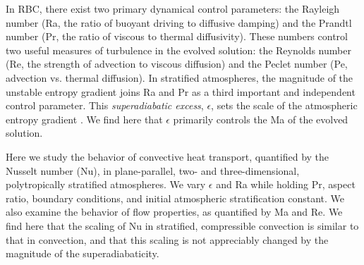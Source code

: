 In RBC, there exist two primary dynamical control parameters: 
the Rayleigh number (Ra, the ratio of
buoyant driving to diffusive damping) and the Prandtl number 
(Pr, the ratio of viscous to thermal
diffusivity). These numbers control two useful
measures of turbulence in the evolved solution:
the Reynolds
number (Re, the strength of advection to viscous diffusion)
and the Peclet number (Pe, advection vs. thermal diffusion).  
In stratified atmospheres, the magnitude of the unstable entropy gradient
joins Ra and Pr as a third important and independent control parameter.  This 
\emph{superadiabatic excess}, $\epsilon$,
sets the scale of the atmospheric entropy gradient \cite{graham1975}.
We find here that $\epsilon$ primarily controls the Ma of the evolved solution.

Here we study the behavior of convective heat transport, 
quantified by the Nusselt number (Nu), in plane-parallel, 
two- and three-dimensional, polytropically stratified atmospheres.  
We vary $\epsilon$ and Ra while holding Pr, aspect ratio, boundary conditions,
and initial atmospheric stratification
constant.  We also examine the behavior of flow properties, as quantified by Ma and Re.
We find here that the scaling of Nu in stratified, compressible convection 
is similar to that in \RB convection,
and that this scaling is not appreciably changed by the magnitude of the superadiabaticity.

